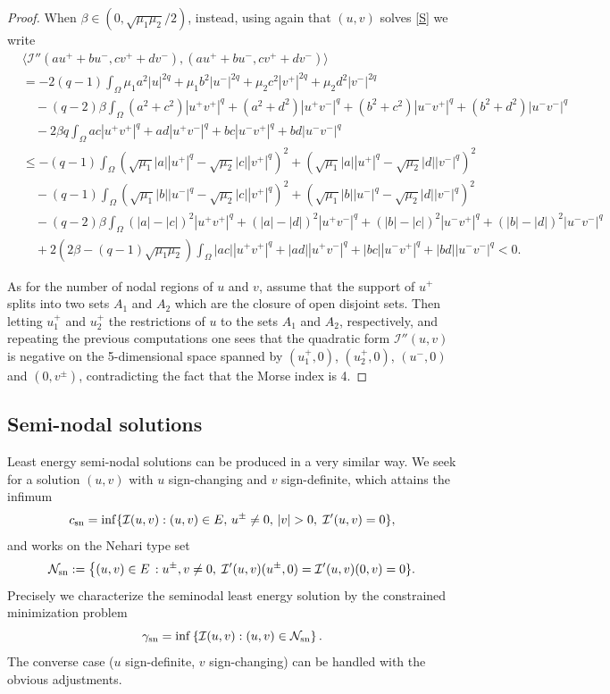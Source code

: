 \documentclass[reqno]{amsart}
\begin{document}
\begin{proof}
When $\beta\in (0,\sqrt{\mu_1\mu_2}/2)$, instead, using again that $(u,v)$
solves \eqref{S} we write
\begin{align*}
&\langle\mathcal I''(au^++bu^-,cv^++dv^-) ,(au^++bu^-,cv^++dv^-) \rangle  \\
& = -2(q-1) \int_{\Omega}\mu_1 a^2 |u|^{2q} +\mu_1 b^2 |u^-|^{2q}
 + \mu_2 c^2|v^+|^{2q} + \mu_2 d^2|v^-|^{2q} \\
&\quad - (q-2)\beta \int_{\Omega} (a^2+c^2)|u^+ v^+|^q + (a^2+d^2)|u^+
  v^-|^q + (b^2+c^2)|u^- v^+|^q + (b^2+d^2)|u^- v^-|^q \\
&\quad -2\beta q \int_{\Omega} ac|u^+ v^+|^q + ad|u^+ v^-|^q + bc|u^- v^+|^q
 + bd|u^- v^-|^q \\
&\leq   -(q-1) \int_{\Omega}\left(\sqrt{\mu_1} |a| |u^+|^{q}
 - \sqrt{\mu_2}|c||v^+|^q\right)^2 + \left(\sqrt{\mu_1} |a| |u^+|^{q}
 - \sqrt{\mu_2}|d||v^-|^q\right)^2 \\
&\quad  -(q-1) \int_{\Omega}\left(\sqrt{\mu_1} |b| |u^-|^{q}
 - \sqrt{\mu_2}|c||v^+|^q\right)^2 + \left(\sqrt{\mu_1} |b| |u^-|^{q}
 - \sqrt{\mu_2}|d||v^-|^q\right)^2  \\
&\quad - (q-2)\beta \int_{\Omega} (|a|-|c|)^2|u^+ v^+|^q + (|a|-|d|)^2|u^+ v^-|^q
 + (|b|-|c|)^2|u^- v^+|^q + (|b|-|d|)^2|u^- v^-|^q
  \\
&\quad +2\left(2\beta -(q-1)\sqrt{\mu_1\mu_2} \right)\int_{\Omega} |ac||u^
 + v^+|^q + |ad||u^+ v^-|^q + |bc||u^- v^+|^q + |bd||u^- v^-|^q
 <0 .
 \end{align*}

As for the number of nodal regions of $u$ and $v$, assume that the support of $u^+$
splits into two sets $A_1$ and $A_2$ which are the closure of open disjoint sets.
Then letting $u^+_1$ and $u^+_2$ the restrictions of $u$ to the sets $A_1$ and $A_2$,
respectively, and repeating the previous computations one sees that the quadratic
form $\mathcal I''(u,v)$ is negative  on the 5-dimensional  space spanned by $(u^+_1,0)$,
$(u^+_2,0)$, $(u^-,0)$ and $(0,v^{\pm})$, contradicting the fact that the Morse index
is 4.
\end{proof}

\subsection{Semi-nodal solutions} \label{sub:seminodal}

Least energy semi-nodal solutions can be produced in a very similar way.
We seek for a solution $(u,v)$ with $u$ sign-changing and $v$ sign-definite,
which attains the infimum
\[
 c_{\rm sn} =\inf \{ \mathcal I(u,v) : (u,v)\in E,  \, u^{\pm}\neq 0,
  \,| v|>0 , \; \mathcal I'(u,v)=0  \},
 \]
and works on the Nehari type set
\begin{equation} \label{def:Neharisnod}
  \mathcal N_{\rm sn}:=  \big\{ (u,v)\in E\, :  u^{\pm}, v \neq 0, \;
   \mathcal I'(u,v)(u^{\pm},0)= \mathcal I'(u,v) (0,v)=0 \}.
\end{equation}
Precisely we characterize the seminodal least energy solution by the constrained
minimization problem
\[
\gamma_{\rm sn}=\inf \left\{ \mathcal I(u,v) : (u,v)\in \mathcal N_{\rm sn} \right\}.
\]
The converse case ($u$ sign-definite, $v$ sign-changing) can be handled with the
obvious adjustments.
\end{document}
